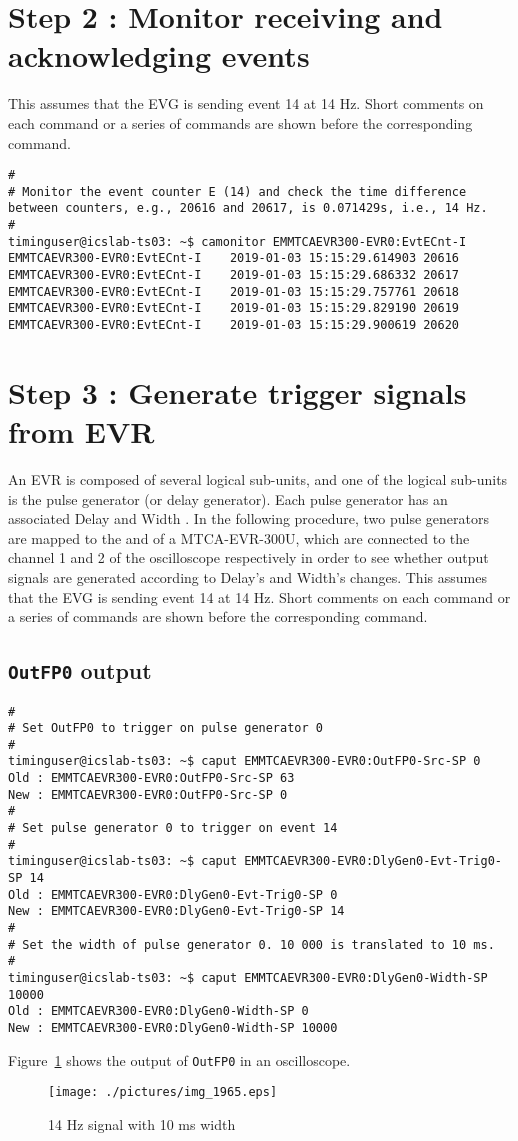 \documentclass[11pt
  , a4paper
  , article
  , oneside
  , showtrims
]{memoir}
\begin{document}
{\section{Step 2 : Monitor receiving and acknowledging events}
This assumes that the EVG is sending event 14 at 14 Hz. Short comments on each command or a series of commands are shown before the corresponding command.
\begin{lstlisting}[style=termstylenumber]
#
# Monitor the event counter E (14) and check the time difference between counters, e.g., 20616 and 20617, is 0.071429s, i.e., 14 Hz.
#
timinguser@icslab-ts03: ~$ camonitor EMMTCAEVR300-EVR0:EvtECnt-I
EMMTCAEVR300-EVR0:EvtECnt-I    2019-01-03 15:15:29.614903 20616
EMMTCAEVR300-EVR0:EvtECnt-I    2019-01-03 15:15:29.686332 20617
EMMTCAEVR300-EVR0:EvtECnt-I    2019-01-03 15:15:29.757761 20618
EMMTCAEVR300-EVR0:EvtECnt-I    2019-01-03 15:15:29.829190 20619
EMMTCAEVR300-EVR0:EvtECnt-I    2019-01-03 15:15:29.900619 20620
\end{lstlisting}


\section{Step 3 : Generate trigger signals from EVR}
An EVR is composed of several logical sub-units, and one of the logical sub-units is the pulse generator (or delay generator). Each pulse generator has an associated Delay and Width \cite{EVR-USER-GUIDE}. In the following procedure, two pulse generators are mapped to the  and  of a MTCA-EVR-300U, which are connected to the channel 1 and 2 of the oscilloscope respectively in order to see whether output signals are generated according to Delay's and Width's changes. This assumes that the EVG is sending event 14 at 14 Hz. Short comments on each command or a series of commands are shown before the corresponding command.

\subsection{\texttt{OutFP0} output}
\begin{lstlisting}[style=termstyle]
#
# Set OutFP0 to trigger on pulse generator 0
#
timinguser@icslab-ts03: ~$ caput EMMTCAEVR300-EVR0:OutFP0-Src-SP 0
Old : EMMTCAEVR300-EVR0:OutFP0-Src-SP 63
New : EMMTCAEVR300-EVR0:OutFP0-Src-SP 0
#
# Set pulse generator 0 to trigger on event 14
#
timinguser@icslab-ts03: ~$ caput EMMTCAEVR300-EVR0:DlyGen0-Evt-Trig0-SP 14
Old : EMMTCAEVR300-EVR0:DlyGen0-Evt-Trig0-SP 0
New : EMMTCAEVR300-EVR0:DlyGen0-Evt-Trig0-SP 14
#
# Set the width of pulse generator 0. 10 000 is translated to 10 ms.
#
timinguser@icslab-ts03: ~$ caput EMMTCAEVR300-EVR0:DlyGen0-Width-SP 10000
Old : EMMTCAEVR300-EVR0:DlyGen0-Width-SP 0
New : EMMTCAEVR300-EVR0:DlyGen0-Width-SP 10000
\end{lstlisting}
Figure~\ref{fig:14Hz} shows the output of \texttt{OutFP0} in an oscilloscope.
\begin{figure}[!ht]
  \centering
    \texttt{[image: ./pictures/img\_1965.eps]}
  \caption{14 Hz signal with 10 ms width}
  \label{fig:14Hz}
\end{figure}

}
\end{document}
